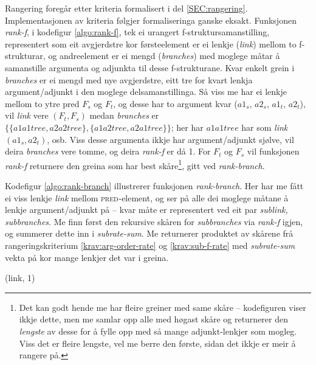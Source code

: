\documentclass[12pt,a4paper,oneside,draft]{report}
\newcommand{\F}[2]{\textsc{#1}\ensuremath{_{#2}}}
\newcommand{\PRED}{\F{pred}{}}
\begin{document}
 Rangering foregår etter kriteria formalisert i del
 \ref{SEC:rangering}. Implementasjonen av kriteria følgjer
 formaliseringa ganske eksakt. Funksjonen \emph{rank-f}, i kodefigur
 \ref{algo:rank-f}, tek ei urangert f\hyp{}struktursamanstilling,
 representert som eit avgjerdstre kor førsteelement er ei lenkje
 (\emph{link}) mellom to f\hyp{}strukturar, og andreelement er ei mengd
 (\emph{branches}) med moglege måtar å samanstille argumenta og adjunkta
 til desse f\hyp{}strukturane. Kvar enkelt grein i \emph{branches} er ei mengd
 med nye avgjerdstre, eitt tre for kvart lenkja argument/adjunkt i den
 moglege delsamanstillinga. Så viss me har ei lenkje mellom to ytre
 pred $F_s$ og $F_t$, og desse har to argument kvar ($a1_s$, $a2_s$,
 $a1_t$, $a2_t$), vil \emph{link} vere $(F_t,F_s)$ medan \emph{branches} er $\{
 \{ a1a1tree, a2a2tree \}, \{ a1a2tree, a2a1tree \} \}$; her har
 $a1a1tree$ har som \emph{link} $(a1_s, a2_t)$, osb. Viss desse argumenta
 ikkje har argument/adjunkt sjølve, vil deira \emph{branches} vere tomme,
 og deira \emph{rank-f} er då 1. For $F_t$ og $F_s$ vil funksjonen \emph{rank-f}
 returnere den greina som har best skåre\footnote{Det kan godt hende me har fleire greiner med same skåre --
        kodefiguren viser ikkje dette, men me samlar opp alle med
        høgast skåre og returnerer den \emph{lengste} av desse for å fylle
        opp med så mange adjunkt-lenkjer som mogleg. Viss det er
        fleire lengste, vel me berre den første, sidan det ikkje er
        meir å rangere på. }, gitt ved
 \emph{rank-branch}.

 Kodefigur \ref{algo:rank-branch} illustrerer funksjonen
 \emph{rank-branch}. Her har me fått ei viss lenkje \emph{link} mellom
 \PRED{}-element, og ser på alle dei moglege måtane å lenkje
 argument/adjunkt på -- kvar måte er representert ved eit par
 \emph{sublink, subbranches}. Me finn først den rekursive skåren for
 \emph{subbranches} via \emph{rank-f} igjen, og summerer dette inn i
 \emph{subrate-sum}. Me returnerer produktet av skårene frå
 rangeringskriterium \ref{krav:arg-order-rate} og
 \ref{krav:sub-f-rate} med \emph{subrate-sum} vekta på kor mange lenkjer
 det var i greina.

     \begin{algorithm}[htbp]
      \caption{rank-f(seen, link, branches)}
      \label{algo:rank-f}

       {\Return (link, 1)}
      \end{algorithm}
\end{document}
